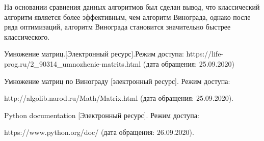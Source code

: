 \documentclass[12pt]{report}
\begin{document}
На основании сравнения данных алгоритмов был сделан вывод, что классический алгоритм является более эффективным, чем алгоритм Винограда, однако после ряда оптимизаций, алгоритм Винограда становится значительно быстрее классического. 




\begin{thebibliography}{9}
	  Умножение матриц.[Электронный ресурс].Режим доступа: https://life-prog.ru/2\_90314\_umnozhenie-matrits.html (дата обращения: 25.09.2020)
	
	  Умножение матриц по Винограду [электронный ресурс]. Режим доступа:
	
	http://algolib.narod.ru/Math/Matrix.html
	(дата обращения: 25.09.2020).
	
	 Python documentation [Электронный ресурс]. Режим доступа:
	
	https://www.python.org/doc/
	(дата обращения: 26.09.2020).
	
\end{thebibliography}
\end{document}
